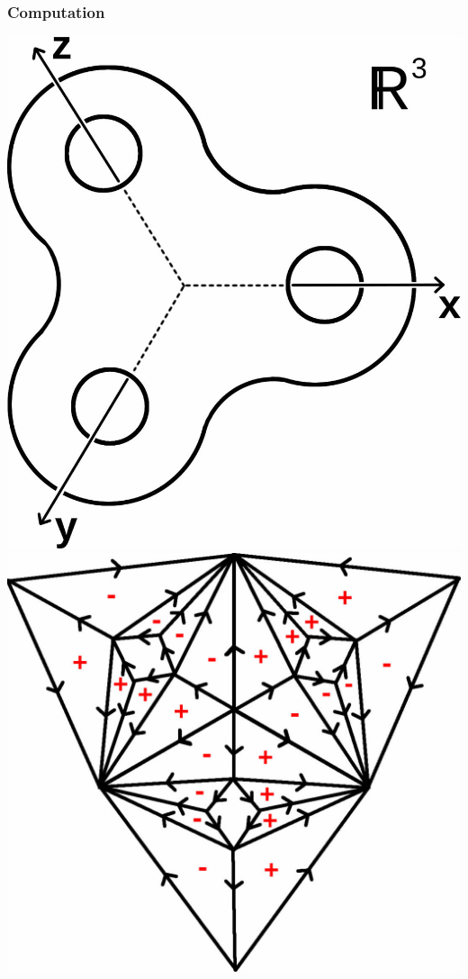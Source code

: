 \documentclass{beamer}[10pt]
\theoremstyle{definition}
\begin{document}
\begin{frame}
\frametitle{Computation}
\includegraphics[scale=0.12]{Genus3ActionCrossSection.jpg}
\hfill
\includegraphics[scale=0.12]{Genus3ActionDeltaComplex.jpg}
\end{frame}
\end{document}
